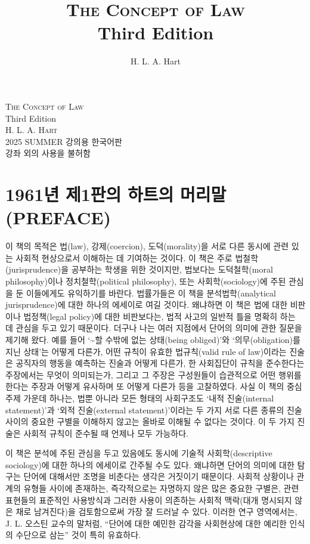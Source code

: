 \documentclass[12pt, oneside]{book}  %
\title{\Huge\textsc{The Concept of Law} \\[2ex] \Large Third Edition}
\author{\Large H. L. A. Hart}
\date{}
\begin{document}
\begin{titlepage}
  \centering
  \vspace*{3cm}
  {\Huge\textsc{The Concept of Law}}\\[1.5ex]
  {\Large Third Edition}\\[4ex]
  \textsc{H. L. A. Hart}\\[6ex]
  {\small 2025 SUMMER 강의용 한국어판\\
  강좌 외의 사용을 불허함}
  \vfill
\end{titlepage}

\section{1961년 제1판의 하트의
머리말(PREFACE)}\label{uxb144-uxc81c1uxd310uxc758-uxd558uxd2b8uxc758-uxba38uxb9acuxb9d0preface}

이 책의 목적은 법(law), 강제(coercion), 도덕(morality)을 서로 다른
동시에 관련 있는 사회적 현상으로서 이해하는 데 기여하는 것이다. 이 책은
주로 법철학(jurisprudence)을 공부하는 학생을 위한 것이지만, 법보다는
도덕철학(moral philosophy)이나 정치철학(political philosophy), 또는
사회학(sociology)에 주된 관심을 둔 이들에게도 유익하기를 바란다.
법률가들은 이 책을 분석법학(analytical jurisprudence)에 대한 하나의
에세이로 여길 것이다. 왜냐하면 이 책은 법에 대한 비판이나 법정책(legal
policy)에 대한 비판보다는, 법적 사고의 일반적 틀을 명확히 하는 데 관심을
두고 있기 때문이다. 더구나 나는 여러 지점에서 단어의 의미에 관한 질문을
제기해 왔다. 예를 들어 `\textasciitilde 할 수밖에 없는 상태(being
obliged)'와 `의무(obligation)를 지닌 상태'는 어떻게 다른가, 어떤 규칙이
유효한 법규칙(valid rule of law)이라는 진술은 공직자의 행동을 예측하는
진술과 어떻게 다른가, 한 사회집단이 규칙을 준수한다는 주장에서는 무엇이
의미되는가, 그리고 그 주장은 구성원들이 습관적으로 어떤 행위를 한다는
주장과 어떻게 유사하며 또 어떻게 다른가 등을 고찰하였다. 사실 이 책의
중심 주제 가운데 하나는, 법뿐 아니라 모든 형태의 사회구조도 `내적
진술(internal statement)'과 `외적 진술(external statement)'이라는 두
가지 서로 다른 종류의 진술 사이의 중요한 구별을 이해하지 않고는 올바로
이해될 수 없다는 것이다. 이 두 가지 진술은 사회적 규칙이 준수될 때
언제나 모두 가능하다.

이 책은 분석에 주된 관심을 두고 있음에도 동시에 기술적
사회학(descriptive sociology)에 대한 하나의 에세이로 간주될 수도 있다.
왜냐하면 단어의 의미에 대한 탐구는 단어에 대해서만 조명을 비춘다는
생각은 거짓이기 때문이다. 사회적 상황이나 관계의 유형들 사이에 존재하는,
즉각적으로는 자명하지 않은 많은 중요한 구별은, 관련 표현들의 표준적인
사용방식과 그러한 사용이 의존하는 사회적 맥락(대개 명시되지 않은 채로
남겨진다)을 검토함으로써 가장 잘 드러날 수 있다. 이러한 연구 영역에서는,
J. L. 오스틴 교수의 말처럼, ``단어에 대한 예민한 감각을 사회현상에 대한
예리한 인식의 수단으로 삼는'' 것이 특히 유효하다.
\end{document}
